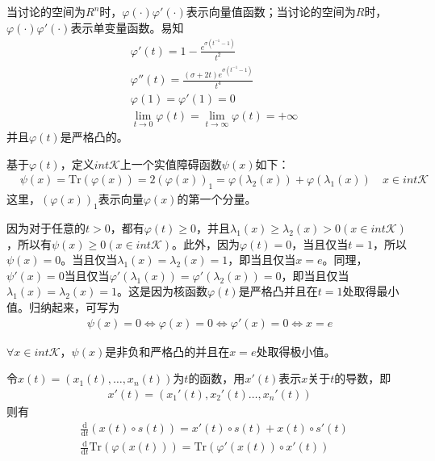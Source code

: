         \par
        当讨论的空间为$R^n$时，${\varphi}(\cdot){\varphi}'(\cdot)$表示向量值函数；当讨论的空间为$R$时，${\varphi}(\cdot){\varphi}'(\cdot)$表示单变量函数。易知
        \begin{align*}
         & {\varphi}'(t)=1-\frac{e^{\sigma(t^{-1}-1)}}{t^2}\\
         & {\varphi}''(t)=\frac{(\sigma+2t)e^{\sigma(t^{-1}-1)}}{t^4}\\
         & \varphi(1)={\varphi}'(1)=0\\
         & \mathop{\lim}\limits_{t\to 0}\varphi(t)=\mathop{\lim}\limits_{t\to \infty}\varphi(t)=+\infty
        \end{align*}
        并且${\varphi}(t)$是严格凸的。
        \par
        基于${\varphi}(t)$，定义$int{}\mathcal{K}$上一个实值障碍函数${\psi}(x)$如下：
        \begin{align*}
        & {\psi}(x)=\mathrm{Tr}({\varphi}(x))=2({\varphi}(x))_1=\varphi({\lambda}_2(x))+\varphi({\lambda}_1(x))\quad x \in int{}\mathcal{K}
        \end{align*}
        这里，$(\varphi(x))_1$表示向量$\varphi(x)$的第一个分量。
        \par
        因为对于任意的$t>0$，都有$\varphi(t)\geqslant 0$，并且${\lambda}_1(x)\geqslant {\lambda}_2(x)>0(x \in int{}\mathcal{K})$，所以有$\psi(x)\geqslant 0(x\in int{}\mathcal{K})$。此外，因为$\varphi(t)=0$，当且仅当$t=1$，所以$\psi(x)=0$。当且仅当${\lambda}_1(x)={\lambda}_2(x)=1$，即当且仅当$x = e$。同理，${\psi}'(x)=0$当且仅当${\varphi}'({\lambda}_1(x))={\varphi}'({\lambda}_2(x))=0$，即当且仅当${\lambda}_1(x)={\lambda}_2(x)=1$。这是因为核函数$\varphi(t)$是严格凸并且在$t=1$处取得最小值。归纳起来，可写为
        \begin{align*}
         {\psi}(x)=0\Leftrightarrow {\varphi}(x)=0\Leftrightarrow {\varphi}'(x)=0\Leftrightarrow x=e
        \end{align*}
          \begin{lemma}
          $\forall x \in int{}\mathcal{K}$，$\psi(x)$是非负和严格凸的并且在$x=e$处取得极小值。
          \end{lemma}
          \par
          令$x(t)=(x_1(t),\ldots,x_n(t))$为$t$的函数，用$x'(t)$表示$x$关于$t$的导数，即
        \begin{align*}
         x'(t)=(x_1'(t),x_2'(t)\ldots,x_n'(t))
        \end{align*}
        则有
        \begin{align*}
         & \frac{\mathrm{d}}{\mathrm{d}t}(x(t)\circ s(t))=x'(t)\circ s(t)+x(t)\circ s'(t)\\
         & \frac{\mathrm{d}}{\mathrm{d}t}\mathrm{Tr}(\varphi(x(t)))=\mathrm{Tr}({\varphi}'(x(t))\circ x'(t))
        \end{align*}
